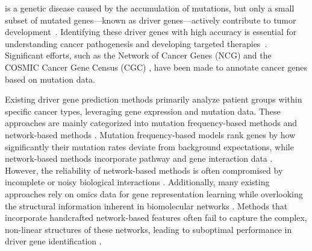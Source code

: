  is a genetic disease caused by the accumulation of mutations, but only a small subset of mutated genes—known as driver genes—actively contribute to tumor development~\cite{dees2012music,vogelstein2013cancer,leiserson2015pan,weinstein2013tcga,bashashati2012drivernet}. Identifying these driver genes with high accuracy is essential for understanding cancer pathogenesis and developing targeted therapies~\cite{alexandrov2013signatures,lawrence2013mutational,hou2014dawnrank}. Significant efforts, such as the Network of Cancer Genes (NCG) \cite{repana2019network} and the COSMIC Cancer Gene Census (CGC) \cite{sondka2018cosmic}, have been made to annotate cancer genes based on mutation data.

Existing driver gene prediction methods primarily analyze patient groups within specific cancer types, leveraging gene expression and mutation data. These approaches are mainly categorized into mutation frequency-based methods \cite{tamborero2013oncodriveclust,gillman2023identifying} and network-based methods \cite{song2019identifying,peng2021identifying,peng2022improving}. Mutation frequency-based models rank genes by how significantly their mutation rates deviate from background expectations, while network-based methods incorporate pathway and gene interaction data \cite{song2020entropy,zhang2022dgmp}. However, the reliability of network-based methods is often compromised by incomplete or noisy biological interactions \cite{cheng2016advances}. Additionally, many existing approaches rely on omics data for gene representation learning while overlooking the structural information inherent in biomolecular networks \cite{collier2019lotus,yi2021graphrepresentation}. Methods that incorporate handcrafted network-based features often fail to capture the complex, non-linear structures of these networks, leading to suboptimal performance in driver gene identification \cite{mourikis2019cancer,nulsen2021pancancer}.


